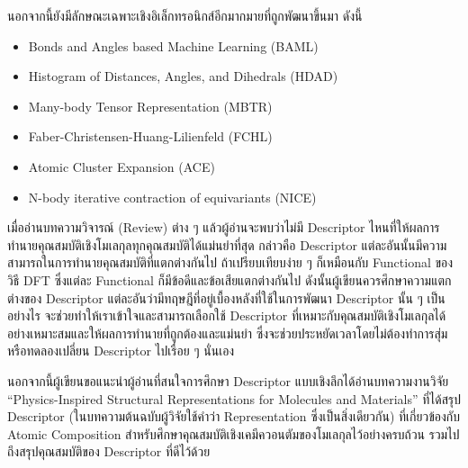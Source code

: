 นอกจากนี้ยังมีลักษณะเฉพาะเชิงอิเล็กทรอนิกส์อีกมากมายที่ถูกพัฒนาขึ้นมา\autocite{faber2018} ดังนี้
%
\begin{itemize}[topsep=0pt,noitemsep]\setlength\itemsep{0.5em}
    \item Bonds and Angles based Machine Learning (BAML)\autocite{huang2016}

    \item Histogram of Distances, Angles, and Dihedrals (HDAD)\autocite{faber2017}

    \item Many-body Tensor Representation (MBTR)\autocite{huo2022,langer2022}

    \item Faber-Christensen-Huang-Lilienfeld (FCHL)\autocite{faber2018}

    \item Atomic Cluster Expansion (ACE)\autocite{drautz2019,kovacs2021}

    \item N-body iterative contraction of equivariants (NICE)\autocite{nigam2020}
\end{itemize}

เมื่ออ่านบทความวิจารณ์ (Review) ต่าง ๆ แล้วผู้อ่านจะพบว่าไม่มี Descriptor ไหนที่ให้ผลการทำนายคุณสมบัติเชิงโมเลกุลทุกคุณสมบัติได้แม่นยำที่สุด กล่าวคือ Descriptor แต่ละอันนั้นมีความสามารถในการทำนายคุณสมบัติที่แตกต่างกันไป ถ้าเปรียบเทียบง่าย ๆ ก็เหมือนกับ Functional ของวิธี DFT ซึ่งแต่ละ Functional ก็มีข้อดีและข้อเสียแตกต่างกันไป ดังนั้นผู้เขียนควรศึกษาความแตกต่างของ Descriptor แต่ละอันว่ามีทฤษฎีที่อยู่เบื้องหลังที่ใช้ในการพัฒนา Descriptor นั้น ๆ เป็นอย่างไร จะช่วยทำให้เราเข้าใจและสามารถเลือกใช้ Descriptor ที่เหมาะกับคุณสมบัติเชิงโมเลกุลได้อย่างเหมาะสมและให้ผลการทำนายที่ถูกต้องและแม่นยำ ซึ่งจะช่วยประหยัดเวลาโดยไม่ต้องทำการสุ่มหรือทดลองเปลี่ยน Descriptor ไปเรื่อย ๆ นั่นเอง

นอกจากนี้ผู้เขียนขอแนะนำผู้อ่านที่สนใจการศึกษา Descriptor แบบเชิงลึกได้อ่านบทความงานวิจัย \enquote{Physics-Inspired Structural Representations for Molecules and Materials}\autocite{musil2021} ที่ได้สรุป Descriptor (ในบทความต้นฉบับผู้วิจัยใช้คำว่า Representation ซึ่งเป็นสิ่งเดียวกัน) ที่เกี่ยวข้องกับ Atomic Composition สำหรับศึกษาคุณสมบัติเชิงเคมีควอนตัมของโมเลกุลไว้อย่างครบถ้วน รวมไปถึงสรุปคุณสมบัติของ Descriptor ที่ดีไว้ด้วย
